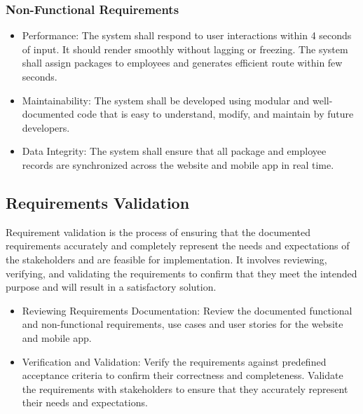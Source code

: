 \subsubsection{Non-Functional Requirements}
\begin{itemize}
    \item Performance: The system shall respond to user interactions within 4 seconds of input.
    It should render smoothly without lagging or freezing. The system shall assign packages to employees and generates efficient route within few seconds.
    \item Maintainability: The system shall be developed using modular and well-documented
    code that is easy to understand, modify, and maintain by future developers.
    \item Data Integrity: The system shall ensure that all package and employee records are synchronized across the website and mobile app in real time.
\end{itemize}
\subsection{Requirements Validation}
Requirement validation is the process of ensuring that the documented requirements accurately and completely represent the needs and expectations of the stakeholders and are feasible for implementation. It involves reviewing, verifying, and validating the requirements to confirm that they meet the intended purpose and will result in a satisfactory solution.
 \begin{itemize}
     \item  Reviewing Requirements Documentation: Review the documented functional and
     non-functional requirements, use cases and user stories for the website and mobile app.
     \item Verification and Validation: Verify the requirements against predefined acceptance criteria to confirm their correctness and completeness. Validate the requirements with stakeholders to ensure that they accurately represent their needs and expectations.
 \end{itemize}

